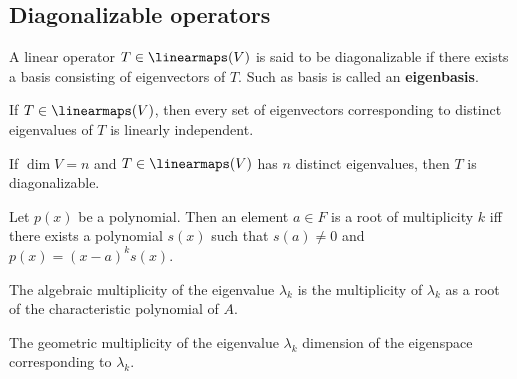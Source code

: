 \subsection{Diagonalizable operators}

\begin{definition}
  A linear operator $T \in \linearmaps(V)$ is said to be diagonalizable if there exists a basis consisting of eigenvectors of $T$. Such as basis is called an \textbf{eigenbasis}.
\end{definition}

\begin{lemma}
  If $T \in \linearmaps(V)$, then every set of eigenvectors corresponding to distinct eigenvalues of $T$ is linearly independent.
\end{lemma}

\begin{lemma}
  If $\dim V = n$ and $T \in \linearmaps(V)$ has $n$ distinct eigenvalues, then $T$ is diagonalizable.
\end{lemma}

\begin{definition}
  Let $p(x)$ be a polynomial. Then an element $a \in F$ is a root of multiplicity $k$ iff there exists a polynomial $s(x)$ such that $s(a) \neq 0$ and $p(x) = (x - a)^k s(x)$.
\end{definition}

\begin{definition}
  The algebraic multiplicity of the eigenvalue $\lambda_k$ is the multiplicity of $\lambda_k$ as a root of the characteristic polynomial of $A$.
\end{definition}

\begin{definition}
  The geometric multiplicity of the eigenvalue $\lambda_k$ dimension of the eigenspace corresponding to $\lambda_k$.
\end{definition}



